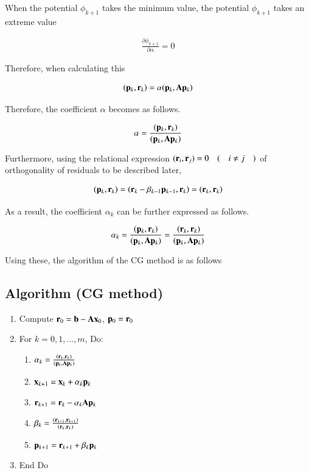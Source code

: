 When the potential $\phi_{k+1}$ takes the minimum value, the potential $\phi_{k+1}$ takes an extreme value

\begin{eqnarray}
\frac{\partial\phi_{k+1}}{\partial\alpha}=0
\end{eqnarray}


Therefore, when calculating this

\begin{eqnarray}
(\mathbf{p}_k,\mathbf{r}_k)=\alpha(\mathbf{p}_k,\mathbf{A}\mathbf{p}_k)
\end{eqnarray}


Therefore, the coefficient $\alpha$ becomes as follows.

\begin{eqnarray}
\alpha=\frac{(\mathbf{p}_k,\mathbf{r}_k)}{(\mathbf{p}_k,\mathbf{A}\mathbf{p}_k)}
\end{eqnarray}


Furthermore, using the relational expression $(\mathbf{r}_i,\mathbf{r}_j)=0 \quad (\quad  i\ne j\quad)$ of orthogonality of residuals to be described later,

\begin{eqnarray}
(\mathbf{p}_k,\mathbf{r}_k)=(\mathbf{r}_k-\beta_{k-1}\mathbf{p}_{k-1},\mathbf{r}_k)=(\mathbf{r}_k,\mathbf{r}_k)
\end{eqnarray}


As a result, the coefficient $\alpha_k$ can be further expressed as follows.

\begin{equation}
\alpha_k=\frac{(\mathbf{p}_k,\mathbf{r}_k)}{(\mathbf{p}_k,\mathbf{A}\mathbf{p}_k)}=\frac{(\mathbf{r}_k,\mathbf{r}_k)}{(\mathbf{p}_k,\mathbf{A}\mathbf{p}_k)}
\end{equation}



Using these, the algorithm of the CG method is as follows


\subsection{Algorithm (CG method)}

\begin{enumerate}
\item Compute $\mathbf{r}_0=\mathbf{b}-\mathbf{A}\mathbf{x}_0$, $\mathbf{p}_0=\mathbf{r}_0$
\item For $k=0,1,\ldots,m$, Do:
\begin{enumerate}
\item $\alpha_k=\frac{(\mathbf{r}_k,\mathbf{r}_k)}{(\mathbf{p}_k,\mathbf{A}\mathbf{p}_k)}$
\item $\mathbf{x}_{k+1}=\mathbf{x}_k+\alpha_k\mathbf{p}_k$
\item $\mathbf{r}_{k+1}=\mathbf{r}_k-\alpha_k\mathbf{A}\mathbf{p}_k$
\item $\beta_k=\frac{(\mathbf{r}_{k+1},\mathbf{r}_{k+1})}{(\mathbf{r}_k,\mathbf{r}_k)}$
\item $\mathbf{p}_{k+1}=\mathbf{r}_{k+1}+\beta_k\mathbf{p}_k$
\end{enumerate}
\item End Do
\end{enumerate}


